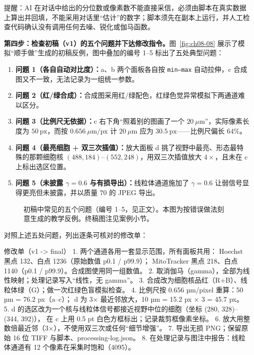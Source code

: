 提醒：AI 在对话中给出的分位数或像素数不能直接采信，必须由脚本在真实数据上算出并回填，不能采用对话里“估计”的数字；脚本须先在副本上运行，并人工检查代码确认没有调用任何去噪、锐化或伽马函数。

\textbf{第四步：检查初稿（v1）的五个问题并下达修改指令。}图~\ref{fig:ch08-08} 展示了模拟“顺手做”生成的初稿反例，图中叠加的编号 1–5 标出了五处典型问题：
\begin{enumerate}
\item \textbf{问题 1（各自自动对比度）：}a、b 两个面板各自按 \texttt{min--max} 自动拉伸，c 合成图又不一致，无法记录为一组统一参数。
\item \textbf{问题 2（红/绿合成）：}合成图采用红/绿配色，红绿色觉异常模拟下两通道难以区分。
\item \textbf{问题 3（比例尺无依据）：}c 右下角“照着别的图画了一个 $20\ \mu\text{m}$”，实际像素长度为 $50\ \text{px}$，而按 $0.656\ \mu\text{m/px}$ 计 $20\ \mu\text{m}$ 应为 $30.5\ \text{px}$——比例尺偏长 $64\%$。
\item \textbf{问题 4（最亮细胞 + 双三次插值）：}放大面板 d 挑了视野中最亮、形态最特殊的那颗细胞核 $(488, 184)\text{--}(552, 248)$，用双三次插值放大 $4\times$，且未在 c 上标出选区位置。
\item \textbf{问题 5（未披露 $\gamma = 0.6$ 与有损导出）：}线粒体通道施加了 $\gamma = 0.6$ 让弱信号显得更亮但未披露，并以质量 $70$ 的 JPEG 导出。
\end{enumerate}

\begin{figure}[htbp]\centering
\resizebox{0.88\linewidth}{!}{}
\caption{初稿中常见的五个问题（编号 1–5，见正文）。本图为按错误做法刻意生成的教学反例。终稿图注见案例小节。}\label{fig:ch08-08}\label{fig:ch08-08-v1}
\end{figure}

对照上述五处问题，列出逐条可核对的修改单：

\begin{Prompt}
修改单（v1 -> final）
1. 两个通道各用一套显示范围，所有面板共用：
   Hoechst 黑点 132、白点 1236（原始数值 p0.1 / p99.9）；
   MitoTracker 黑点 218、白点 1140（p0.1 / p99.9）。合成图使用同一组数值。
2. 取消伽马（gamma），全部为线性映射；处理记录写入“线性，无 gamma”。
3. 合成改为细胞核品红（R+B）、线粒体绿（G）；做一次红绿色盲模拟检查。
4. 比例尺按 0.656 µm/pixel 重算：50 µm = 76.2 px（a–c）；
   d 为 3× 最近邻放大，10 µm = 15.2 px × 3 = 45.7 px。
5. d 的选区改为一个核与线粒体信号都接近视野中位的细胞（坐标 (280, 328)–(344, 392)），
   在 c 上用 0.5 pt 白色方框标出；记录裁剪框像素坐标。
6. 放大用整数倍最近邻（3×），不使用双三次或任何“细节增强”。
7. 导出无损 PNG；保留原始 16 位 TIFF 与脚本、processing-log.json。
8. 在处理记录与图注中报告：线粒体通道有 12 个像素在采集时饱和（4095）。
\end{Prompt}

